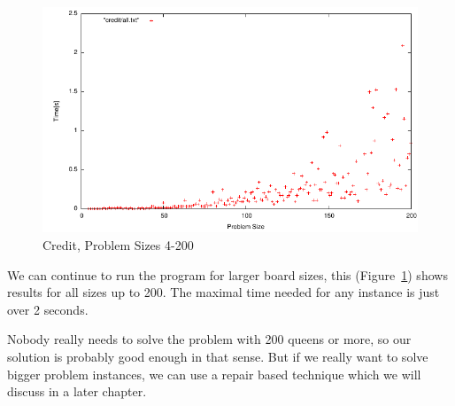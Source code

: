 \begin{figure}[h]
\caption{\label{nqueen:credit200}Credit, Problem Sizes 4-200}
\begin{center}
\includegraphics[width=12cm]{../nqueen/credit/all200}
\end{center}
\end{figure}

We can continue to run the program for larger board sizes, this (Figure~\ref{nqueen:credit200}) shows results for all sizes up to 200. The maximal time needed for any instance is just over 2 seconds.

Nobody really needs to solve the problem with 200 queens or more, so our solution is probably good enough in that sense. But if we really want to solve bigger problem instances, we can use a repair based technique which we will discuss in a later chapter.


